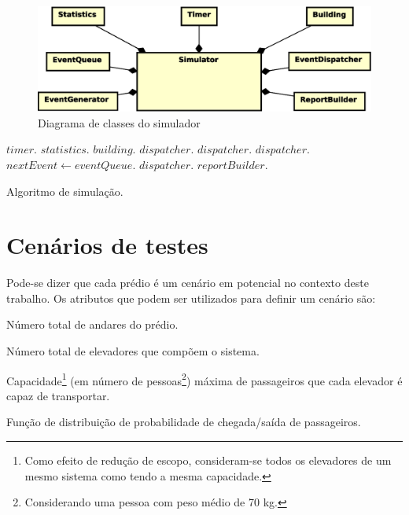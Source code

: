 \begin{figure}[htb!]
  \centering
  \includegraphics[scale=0.6]{img/Simulator.eps}
  \caption{Diagrama de classes do simulador}
\label{fig:diagram:simulator}
\end{figure}

\begin{algorithm}[H]
\begin{center}
\begin{algorithmic}[1]
  \State $timer.$
  \State $statistics.$
  \State $building.$
  \State $dispatcher.$
  \State $dispatcher.$
  \State $dispatcher.$
    \State $nextEvent \gets eventQueue.$
    \State $dispatcher.$
  \EndWhile
  \State $reportBuilder.$
\EndFunction
\end{algorithmic}
\end{center}
\caption
   {\label{alg:sim}Algoritmo de simulação.}
\end{algorithm}

\section{\label{section:scenarios}Cenários de testes}

Pode-se dizer que cada prédio é um cenário em potencial no contexto deste
trabalho. Os atributos que podem ser utilizados para definir um cenário são:

\begin{description}[leftmargin=!,labelwidth=\widthof{\bfseries Pu}]
  \item[F]
  Número total de andares do prédio.
  \item[E]
  Número total de elevadores que compõem o sistema.
  \item[C]
  Capacidade\footnote{Como efeito de redução de escopo, consideram-se todos os
  elevadores de um mesmo sistema como tendo a mesma capacidade.} (em número de
  pessoas\footnote{Considerando uma pessoa com peso médio de 70 kg.}) máxima de
  passageiros que cada elevador é capaz de transportar.
  \item[D]
  Função de distribuição de probabilidade de chegada/saída de passageiros.
\end{description}

